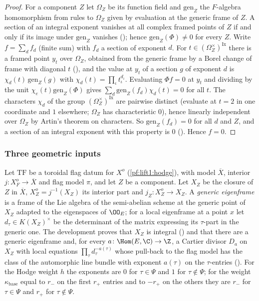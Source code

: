 \begin{proof}
For a component $Z$ let $\Omega_Z$ be its function field and $\mathrm{gen}_Z$ the $F$-algebra
homomorphism from rules to $\Omega_Z$ given by evaluation at the generic frame of $Z$. A section of an
integral exponent vanishes at all complex framed points of $Z$ if and only if its image under
$\mathrm{gen}_Z$ vanishes (); hence
$\mathrm{gen}_Z(\Phi)\ne0$ for every $Z$. Write $f=\sum_df_d$ (finite sum) with $f_d$ a section of exponent
$d$. For $t\in(\Omega_Z^\times)^{\mathrm{Ix}}$ there is a framed point $y_t$ over $\Omega_Z$, obtained from
the generic frame by a Borel change of frame with diagonal $t$
(), and the value at $y_t$ of a section $g$ of exponent
$d$ is $\chi_d(t)\,\mathrm{gen}_Z(g)$ with $\chi_d(t)=\prod_\iota t_\iota^{d_\iota}$. Evaluating $\Phi f=0$ at
$y_t$ and dividing by the unit $\chi_e(t)\mathrm{gen}_Z(\Phi)$ gives
$\sum_d\mathrm{gen}_Z(f_d)\chi_d(t)=0$ for all $t$. The characters $\chi_d$ of the group
$(\Omega_Z^\times)^{\mathrm{Ix}}$ are pairwise distinct (evaluate at $t=2$ in one coordinate and $1$
elsewhere; $\Omega_Z$ has characteristic $0$), hence linearly independent over $\Omega_Z$ by Artin's
theorem on characters. So $\mathrm{gen}_Z(f_d)=0$ for all $d$ and $Z$, and a section of an integral
exponent with this property is $0$ (). Hence $f=0$.
\end{proof}

\subsubsection*{Three geometric inputs}
Let $\mathrm{TF}$ be a toroidal flag datum for $X^o$ (\cref{pf:lift1:hodge}), with model $\overline X$, interior
$j\colon X^o_F\to\overline X$ and flag model $\pi$, and let $Z$ be a component. Let $X_Z$ be the closure of
$Z$ in $\overline X$, $X_Z^o=j^{-1}(X_Z)$ its interior part and $j_Z\colon X_Z^o\to X_Z$. A \emph{generic
eigenframe} is a frame of the Lie algebra of the semi-abelian scheme at the generic point of $X_Z$ adapted
to the eigenspaces of $\OO_E$; for a local eigenframe at a point $x$ let $d_\tau\in K(X_Z)^\times$ be the
determinant of the matrix expressing its $\tau$-part in the generic one. The development proves that
$X_Z$ is integral () and that there are a generic
eigenframe and, for every $a\colon\Hom(E,\C)\to\Z$, a Cartier divisor $D_a$ on $X_Z$ with local equations
$\prod_\tau d_\tau^{-a(\tau)}$ whose pull-back to the flag model has the class of the automorphic line
bundle with exponent $a(\tau)$ on the $\tau$-entries ().
For the Hodge weight $h$ the exponents are $0$ for $\tau\in\Psi$ and $1$ for $\tau\notin\Psi$; for the
weight $\kappa_{\mathrm{base}}$ equal to $r_-$ on the first $r_+$ entries and to $-r_+$ on the others they
are $r_-$ for $\tau\in\Psi$ and $r_+$ for $\tau\notin\Psi$.

